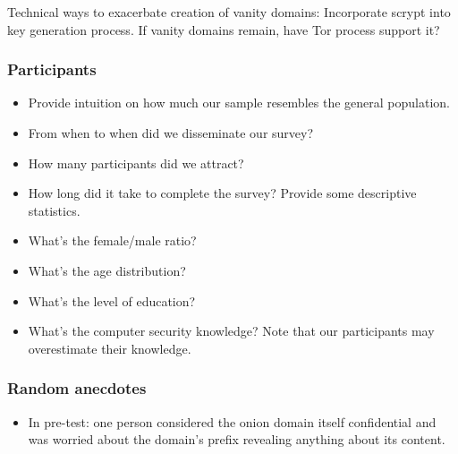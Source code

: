 Technical ways to exacerbate creation of vanity domains: Incorporate scrypt into
key generation process.
If vanity domains remain, have Tor process support it?

\subsubsection{Participants}
\begin{itemize}
    \item Provide intuition on how much our sample resembles the general
        population.
    \item From when to when did we disseminate our survey?
    \item How many participants did we attract?
    \item How long did it take to complete the survey?  Provide some descriptive statistics.
    \item What's the female/male ratio?
    \item What's the age distribution?
    \item What's the level of education?
    \item What's the computer security knowledge?  Note that our participants
        may overestimate their knowledge.
\end{itemize}

\subsubsection{Random anecdotes}
\begin{itemize}
    \item In pre-test: one person considered the onion domain itself
        confidential and was worried about the domain's prefix revealing
        anything about its content.
\end{itemize}
